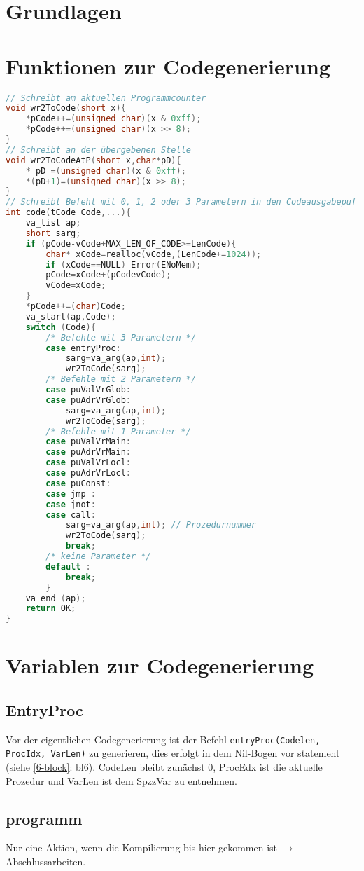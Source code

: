 \section{Grundlagen}
\section{Funktionen zur Codegenerierung}
\begin{lstlisting}[language=C]
// Schreibt am aktuellen Programmcounter
void wr2ToCode(short x){
	*pCode++=(unsigned char)(x & 0xff);
	*pCode++=(unsigned char)(x >> 8);
}
// Schreibt an der übergebenen Stelle
void wr2ToCodeAtP(short x,char*pD){
	* pD =(unsigned char)(x & 0xff);
	*(pD+1)=(unsigned char)(x >> 8);
}
// Schreibt Befehl mit 0, 1, 2 oder 3 Parametern in den Codeausgabepuffer
int code(tCode Code,...){
	va_list ap;
	short sarg;
	if (pCode-vCode+MAX_LEN_OF_CODE>=LenCode){
		char* xCode=realloc(vCode,(LenCode+=1024));
		if (xCode==NULL) Error(ENoMem);
		pCode=xCode+(pCodevCode);
		vCode=xCode;
	}
	*pCode++=(char)Code;
	va_start(ap,Code);
	switch (Code){
		/* Befehle mit 3 Parametern */
		case entryProc:
			sarg=va_arg(ap,int);
			wr2ToCode(sarg);
		/* Befehle mit 2 Parametern */
		case puValVrGlob:
		case puAdrVrGlob:
			sarg=va_arg(ap,int);
			wr2ToCode(sarg);
		/* Befehle mit 1 Parameter */
		case puValVrMain:
		case puAdrVrMain:
		case puValVrLocl:
		case puAdrVrLocl:
		case puConst:
		case jmp :
		case jnot:
		case call:
			sarg=va_arg(ap,int); // Prozedurnummer
			wr2ToCode(sarg);
			break;
		/* keine Parameter */
		default :
			break;
		}
	va_end (ap);
	return OK;
}
\end{lstlisting}

\section{Variablen zur Codegenerierung}
\subsection{EntryProc}
Vor der eigentlichen Codegenerierung ist der Befehl \lstinline`entryProc(Codelen, ProcIdx, VarLen)` zu generieren, dies erfolgt in dem Nil-Bogen vor statement (siehe \autoref{6-block}: bl6). CodeLen bleibt zunächst 0, ProcEdx ist die aktuelle Prozedur und VarLen ist dem SpzzVar zu entnehmen.
\subsection{programm}
Nur eine Aktion, wenn die Kompilierung bis hier gekommen ist $\to$ Abschlussarbeiten.
